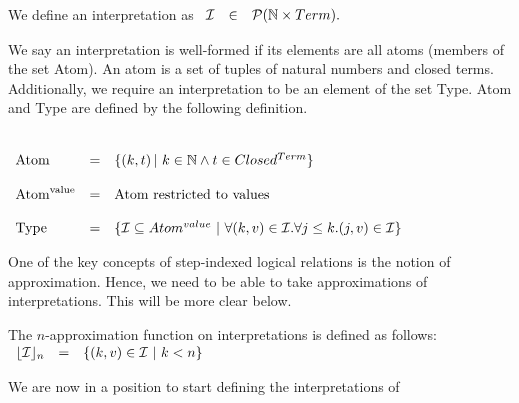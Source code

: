\begin{definition}
  \label{def:interpretations}
  We define an interpretation as
  \begin{math}
    \begin{array}{lll}
      \mathcal{I} & \in & \mathcal{P}(\mathbb{N} \times Term).\\
    \end{array}
  \end{math}
\end{definition}
\noindent
We say an interpretation is well-formed if its elements are all atoms
(members of the set Atom). An atom is a set of tuples of natural
numbers and closed terms. Additionally, we require an interpretation
to be an element of the set Type.  Atom and Type are defined by the
following definition.
\begin{definition}
  \label{def:wellformed_interpretations}
  \ \\
  \begin{math}
    \begin{array}{lllll}
      \text{Atom} & = & \{ (k,t) \,|\ k \in \nat \land t \in Closed^{Term} \}\\
      & \\
      \text{Atom}^{\text{value}} & = & \text{Atom restricted to values}\\
      & \\
      \text{Type} & = & \{ \mathcal{I} \subseteq Atom^{value}\ |\ 
      \forall (k,v) \in \mathcal{I} . \forall j \leq k.(j,v) \in \mathcal{I} \}
      & \\
    \end{array}
  \end{math}
\end{definition}
\noindent
One of the key concepts of step-indexed logical relations is the
notion of approximation.  Hence, we need to be able to take
approximations of interpretations.  This will be more clear below.
\begin{definition}
  \label{def:approximations_of_interpretations}
  The $n$-approximation function on interpretations is defined as follows:\\
  \begin{math}
    \begin{array}{lll}
      \napprox{\interpset}{n} & = & \{ (k,v) \in \interpset\ |\ k < n\}
    \end{array}
  \end{math}
\end{definition}
We are now in a position to start defining the interpretations of
